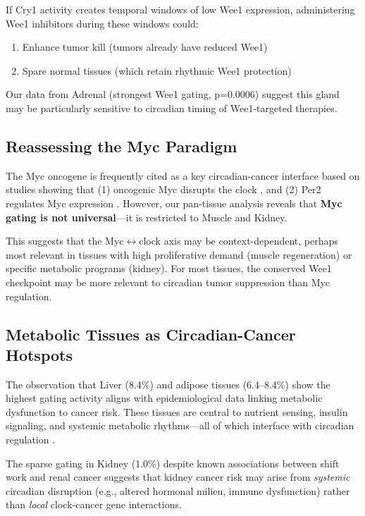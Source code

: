 \documentclass[11pt,letterpaper]{article}
\begin{document}
If Cry1 activity creates temporal windows of low Wee1 expression, administering Wee1 inhibitors during these windows could:
\begin{enumerate}[noitemsep]
    \item Enhance tumor kill (tumors already have reduced Wee1)
    \item Spare normal tissues (which retain rhythmic Wee1 protection)
\end{enumerate}

Our data from Adrenal (strongest Wee1 gating, p=0.0006) suggest this gland may be particularly sensitive to circadian timing of Wee1-targeted therapies.

\subsection{Reassessing the Myc Paradigm}

The Myc oncogene is frequently cited as a key circadian-cancer interface based on studies showing that (1) oncogenic Myc disrupts the clock \citep{altman2015}, and (2) Per2 regulates Myc expression \citep{fu2002}. However, our pan-tissue analysis reveals that \textbf{Myc gating is not universal}---it is restricted to Muscle and Kidney.

This suggests that the Myc$\leftrightarrow$clock axis may be context-dependent, perhaps most relevant in tissues with high proliferative demand (muscle regeneration) or specific metabolic programs (kidney). For most tissues, the conserved Wee1 checkpoint may be more relevant to circadian tumor suppression than Myc regulation.

\subsection{Metabolic Tissues as Circadian-Cancer Hotspots}

The observation that Liver (8.4\%) and adipose tissues (6.4--8.4\%) show the highest gating activity aligns with epidemiological data linking metabolic dysfunction to cancer risk. These tissues are central to nutrient sensing, insulin signaling, and systemic metabolic rhythms---all of which interface with circadian regulation \citep{panda2016}.

The sparse gating in Kidney (1.0\%) despite known associations between shift work and renal cancer \citep{schernhammer2013} suggests that kidney cancer risk may arise from \textit{systemic} circadian disruption (e.g., altered hormonal milieu, immune dysfunction) rather than \textit{local} clock-cancer gene interactions.
\end{document}
